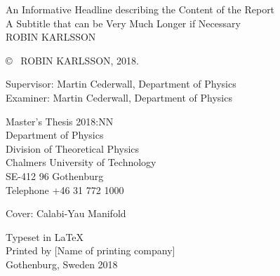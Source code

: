 \newpage
\thispagestyle{plain}
\vspace*{4.5cm}
An Informative Headline describing the Content of the Report\\
A Subtitle that can be Very Much Longer if Necessary\\
ROBIN KARLSSON \setlength{\parskip}{1cm}

\copyright ~ ROBIN KARLSSON, 2018. \setlength{\parskip}{1cm}

Supervisor: Martin Cederwall, Department of Physics\\
Examiner: Martin Cederwall, Department of Physics \setlength{\parskip}{1cm}

Master's Thesis 2018:NN\\	%
Department of Physics\\
Division of Theoretical Physics\\
Chalmers University of Technology\\
SE-412 96 Gothenburg\\
Telephone +46 31 772 1000 \setlength{\parskip}{0.5cm}

\vfill
Cover: Calabi-Yau Manifold \setlength{\parskip}{0.5cm}

Typeset in \LaTeX \\
Printed by [Name of printing company]\\
Gothenburg, Sweden 2018

